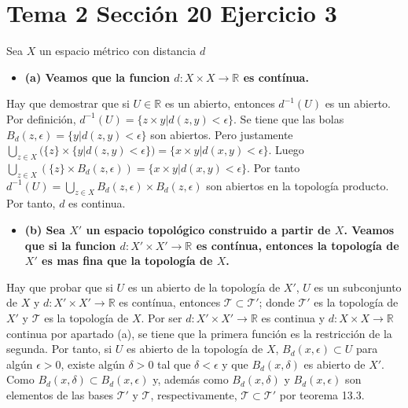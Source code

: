 \documentclass{article}
\begin{document}
\section{Tema 2 Sección 20 Ejercicio 3}
Sea $X$ un espacio métrico con distancia $d$
\begin{itemize}
\item \bf(a) \rm  Veamos que la funcion $d:X\times X\rightarrow \mathbb{R}$ es contínua.
\end{itemize}
Hay que demostrar que si $U\in \mathbb{R}$ es un abierto, entonces $d^{-1}(U)$ es un abierto. Por definición, $d^{-1}(U)=\{z\times y| d(z,y)<\epsilon\}$. Se tiene que las bolas $B_d(z,\epsilon)=\{y|d(z,y)<\epsilon\}$ son abiertos. Pero justamente $\bigcup_{z\in X}(\{z\}\times\{y|d(z,y)<\epsilon\})=\{x\times y|d(x,y)<\epsilon\}$. Luego $\bigcup_{z\in X}(\{z\}\times B_d(z,\epsilon))=\{x\times y|d(x,y)<\epsilon\}$. Por tanto $d^{-1}(U)=\bigcup_{z\in X }B_d(z,\epsilon)\times B_d(z,\epsilon)$ son abiertos en la topología producto. Por tanto, $d$ es continua.
\begin{itemize}
\item \bf(b) \rm  Sea $X'$ un espacio topológico construido a partir de $X$. Veamos que si la funcion $d:X'\times X'\rightarrow \mathbb{R}$ es contínua, entonces la topología de $X'$ es mas fina que la topología de $X$.
\end{itemize}
Hay que probar que si $U$ es un abierto de la topología de $X'$, $U$ es un subconjunto de $X$ y $d:X'\times X'\rightarrow \mathbb{R}$ es contínua, entonces 
$\mathcal{T}\subset \mathcal{T}'$; donde $\mathcal{T}'$ es la topología de $X'$ y $\mathcal{T}$ es la topología de $X$. Por ser $d: X'\times X'\rightarrow \mathbb{R}$ es continua y  $d: X\times X\rightarrow \mathbb{R}$ continua por apartado (a), se tiene que la primera función es la restricción de la segunda. Por tanto, si $U$ es abierto de la topología de $X$, $B_d(x,\epsilon)\subset U$ para algún $\epsilon>0$, existe algún $\delta>0$ tal que $\delta<\epsilon$ y que $B_d(x,\delta)$ es abierto de $X'$. Como $B_d(x,\delta)\subset B_d(x,\epsilon)$ y, además como $B_d(x,\delta)$ y $ B_d(x,\epsilon)$ son elementos de las bases $\mathcal{T}'$ y $\mathcal{T}$, respectivamente, $\mathcal{T}\subset \mathcal{T}'$ por teorema 13.3.
\end{document}
